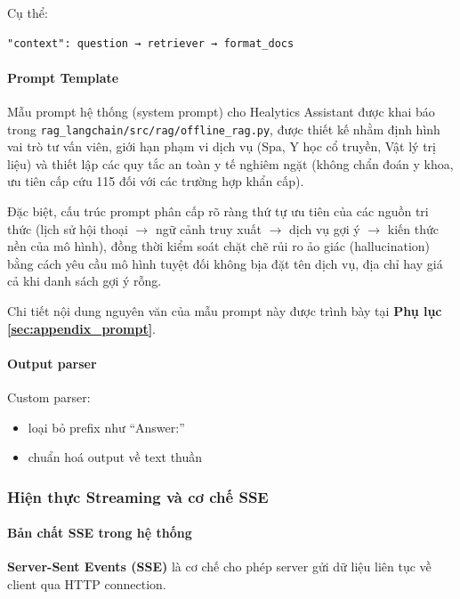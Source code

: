 Cụ thể:

\begin{verbatim}
"context": question → retriever → format_docs
\end{verbatim}


\paragraph{Prompt Template}

Mẫu prompt hệ thống (system prompt) cho Healytics Assistant được khai báo trong \texttt{rag\_langchain/src/rag/offline\_rag.py}, được thiết kế nhằm định hình vai trò tư vấn viên, giới hạn phạm vi dịch vụ (Spa, Y học cổ truyền, Vật lý trị liệu) và thiết lập các quy tắc an toàn y tế nghiêm ngặt (không chẩn đoán y khoa, ưu tiên cấp cứu 115 đối với các trường hợp khẩn cấp).

Đặc biệt, cấu trúc prompt phân cấp rõ ràng thứ tự ưu tiên của các nguồn tri thức (lịch sử hội thoại $\rightarrow$ ngữ cảnh truy xuất $\rightarrow$ dịch vụ gợi ý $\rightarrow$ kiến thức nền của mô hình), đồng thời kiểm soát chặt chẽ rủi ro ảo giác (hallucination) bằng cách yêu cầu mô hình tuyệt đối không bịa đặt tên dịch vụ, địa chỉ hay giá cả khi danh sách gợi ý rỗng.

Chi tiết nội dung nguyên văn của mẫu prompt này được trình bày tại \textbf{Phụ lục \ref{sec:appendix_prompt}}.
\paragraph{Output parser}

Custom parser:

\begin{itemize}
    \item loại bỏ prefix như ``Answer:''
    \item chuẩn hoá output về text thuần
\end{itemize}

\subsubsection{Hiện thực Streaming và cơ chế SSE}

\paragraph{Bản chất SSE trong hệ thống}

\textbf{Server-Sent Events (SSE)} là cơ chế cho phép server gửi dữ liệu liên tục về client qua HTTP connection.


